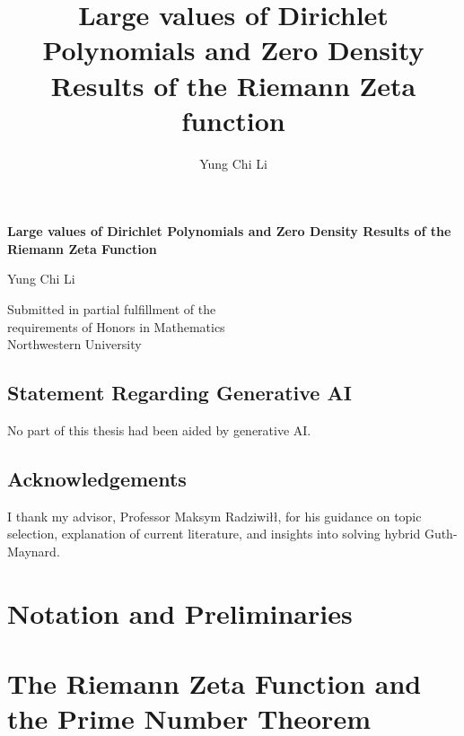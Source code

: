 \documentclass[openany,
ngerman,
toc=flat,
toc=chapterentrywithdots,
captions=tableabove,
listof=entryprefix,
listof=leveldown,
fontsize=12pt,
numbers=noenddot]
{book}
\title{Large values of Dirichlet Polynomials and Zero Density Results of the Riemann Zeta function}
\author{Yung Chi Li}
\date{}
\begin{document}
\begin{titlepage}
    \begin{center}
        \vspace*{1cm}
            
        \Large
        \textbf{Large values of Dirichlet Polynomials and Zero Density Results of the Riemann Zeta Function}
            
        \vspace{0.5cm}
        
        \Large
        Yung Chi Li
            
        \vfill
            
       	Submitted in partial fulfillment of the\\ requirements of
		Honors in Mathematics\\
		
		
		Northwestern University
            
    
            
    \end{center}
\end{titlepage}
\tableofcontents
\section*{Statement Regarding Generative AI}
No part of this thesis had been aided by generative AI.

\section*{Acknowledgements}
I thank my advisor, Professor Maksym Radziwi\l\l, for his guidance on topic selection, explanation of current literature, and insights into solving hybrid Guth-Maynard. 
\chapter{Notation and Preliminaries}



	\chapter{ The Riemann Zeta Function and the Prime Number Theorem}
	
	
\end{document}
